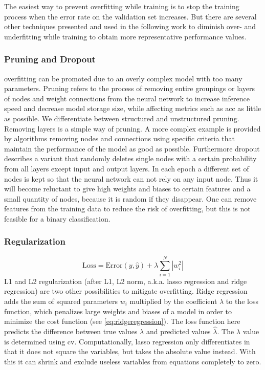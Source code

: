 The easiest way to prevent \gls{overfitting} while training is to stop the training process when the error rate on the validation set increases. But there are several other techniques presented and used in the following work to diminish over- and underfitting while training to obtain more representative performance values.

\subsubsection{Pruning and Dropout}

\Gls{overfitting} can be promoted due to an overly complex model with too many parameters. Pruning refers to the process of removing entire groupings or layers of nodes and weight connections from the neural network to increase inference speed and decrease model storage size, while affecting metrics such as \acrshort{acc} as little as possible. We differentiate between structured and unstructured pruning. Removing layers is a simple way of pruning. A more complex example is provided by algorithms removing nodes and connections using specific criteria that maintain the performance of the model as good as possible. Furthermore dropout describes a variant that randomly deletes single nodes with a certain probability from all layers except input and output layers. In each epoch a different set of nodes is kept so that the neural network can not rely on any input node. Thus it will become reluctant to give high weights and biases to certain features and a small quantity of nodes, because it is random if they disappear. One can remove features from the training data to reduce the risk of \gls{overfitting}, but this is not feasible for a binary classification.

\subsubsection{Regularization}

\begin{equation}
    \text{Loss} = \text{Error}(y, \hat{y}) + \lambda\sum_{i=1}^{N} |w^2_i|
    \label{eq:ridgeregression}
\end{equation}
L1 and L2 regularization (after L1, L2 norm, a.k.a. lasso \gls{regression} and ridge \gls{regression}) are two other possibilities to mitigate \gls{overfitting}. Ridge \gls{regression} adds the sum of squared parameters \( w_i \) multiplied by the coefficient \( \lambda \) to the loss function, which penalizes large weights and biases of a model in order to minimize the cost function (see \cref{eq:ridgeregression}). The loss function here predicts the difference between true values \( \lambda \) and predicted values \( \hat{\lambda} \). The \( \lambda \) value is determined using \acrlong{cv}. Computationally, lasso \gls{regression} only differentiates in that it does not square the variables, but takes the absolute value instead. With this it can shrink and exclude useless variables from equations completely to zero.

